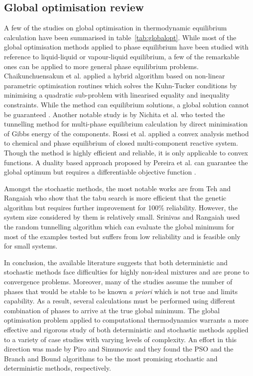 	\subsection{Global optimisation review}
	 A few of the studies on global optimisation in thermodynamic equilibrium calculation have been summarised in table~\ref{tab:globalopt}. While most of the global optimisation methods applied to phase equilibrium have been studied with reference to liquid-liquid or vapour-liquid equilibrium, a few of the remarkable ones can be applied to more general phase equilibrium problems. Chaikunchuensakun et al. \cite{Chaikunchuensakun:2002aa} applied a hybrid algorithm based on non-linear parametric optimisation routines which solves the Kuhn-Tucker conditions by minimising a quadratic sub-problem with linearised equality and inequality constraints. While the method can equilibrium solutions, a global solution cannot be guaranteed \cite{Zhang11}. Another notable study is by Nichita et al. \cite{Nichita02} who tested the tunnelling method for multi-phase equilibrium calculation by direct minimisation of Gibbs energy of the components. Rossi et al. \cite{ROSSI20111226} applied a convex analysis method to chemical and phase equilibrium of closed multi-component reactive system. Though the method is highly efficient and reliable, it is only applicable to convex functions. A duality based approach proposed by Pereira et al. \cite{PEREIRA20101} can guarantee the global optimum but requires a differentiable objective function \cite{Zhang11}.

	 Amongst the stochastic methods, the most notable works are from Teh and Rangaiah \cite{Teh03} who show that the tabu search is more efficient that the genetic algorithm but requires further improvement for 100\% reliability. However, the system size considered by them is relatively small. Srinivas and Rangaiah \cite{Srinivas06} used the random tunnelling algorithm which can evaluate the global minimum for most of the examples tested but suffers from low reliability and is feasible only for small systems.

	 In conclusion, the available literature suggests that both deterministic and stochastic methods face difficulties for highly non-ideal mixtures and are prone to convergence problems. Moreover, many of the studies assume the number of phases that would be stable to be known \textit{a priori} which is not true and limits capability. As a result, several calculations must be performed using different combination of phases to arrive at the true global minimum. The global optimisation problem applied to computational thermodynamics warrants a more effective and rigorous study of both deterministic and stochastic methods applied to a variety of case studies with varying levels of complexity. An effort in this direction was made by Piro and Simunovic \cite{Piro16} and they found the PSO and the Branch and Bound algorithms to be the most promising stochastic and deterministic methods, respectively.

